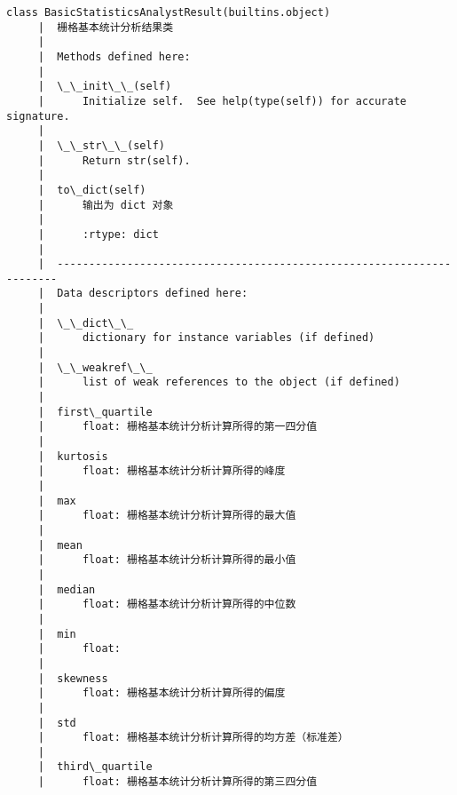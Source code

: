 \documentclass[11pt]{article}
\begin{document}
\begin{Verbatim}[commandchars=\\\{\}]
    class BasicStatisticsAnalystResult(builtins.object)
     |  栅格基本统计分析结果类
     |  
     |  Methods defined here:
     |  
     |  \_\_init\_\_(self)
     |      Initialize self.  See help(type(self)) for accurate signature.
     |  
     |  \_\_str\_\_(self)
     |      Return str(self).
     |  
     |  to\_dict(self)
     |      输出为 dict 对象
     |      
     |      :rtype: dict
     |  
     |  ----------------------------------------------------------------------
     |  Data descriptors defined here:
     |  
     |  \_\_dict\_\_
     |      dictionary for instance variables (if defined)
     |  
     |  \_\_weakref\_\_
     |      list of weak references to the object (if defined)
     |  
     |  first\_quartile
     |      float: 栅格基本统计分析计算所得的第一四分值
     |  
     |  kurtosis
     |      float: 栅格基本统计分析计算所得的峰度
     |  
     |  max
     |      float: 栅格基本统计分析计算所得的最大值
     |  
     |  mean
     |      float: 栅格基本统计分析计算所得的最小值
     |  
     |  median
     |      float: 栅格基本统计分析计算所得的中位数
     |  
     |  min
     |      float:
     |  
     |  skewness
     |      float: 栅格基本统计分析计算所得的偏度
     |  
     |  std
     |      float: 栅格基本统计分析计算所得的均方差（标准差）
     |  
     |  third\_quartile
     |      float: 栅格基本统计分析计算所得的第三四分值
    

\end{Verbatim}
\end{document}
